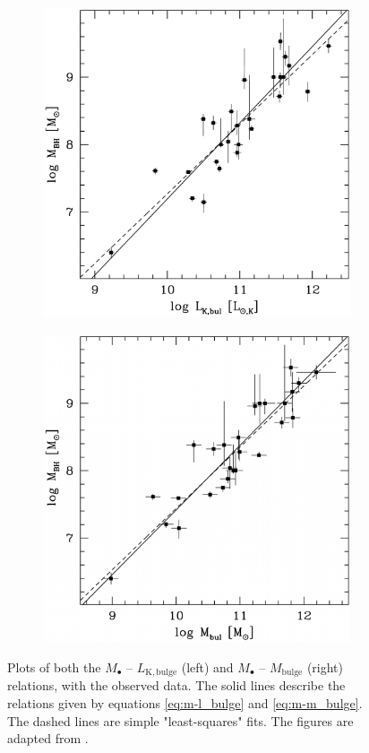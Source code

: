 \documentclass[english, twoside]{HYgradu}
\begin{document}
\begin{figure}
	\centering
	\begin{subfigure}[b]{0.49\textwidth}
		\includegraphics[width=\textwidth]{marconi_l-bul.png}
	\end{subfigure}
	\begin{subfigure}[b]{0.49\textwidth}
		\includegraphics[width=\textwidth]{marconi_m-bul_2.png}
	\end{subfigure}
	\caption{Plots of both the $M_\bullet$ – $L_\mathrm{K,bulge}$ (left) and $M_\bullet$ – $M_\mathrm{bulge}$ (right) relations, with the observed data. The solid lines describe the relations given by equations \ref{eq:m-l_bulge} and \ref{eq:m-m_bulge}. The dashed lines are simple "least-squares" fits. The figures are adapted from \cite{Marconi2003}.}
	\label{figure:m-bulge}
\end{figure}
\end{document}
